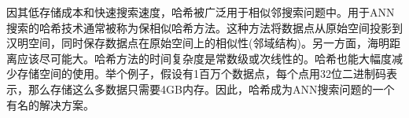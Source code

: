 \documentclass{article}
\begin{document}
因其低存储成本和快速搜索速度，哈希\cite{4031381,Ny2010Semi,PMID:24136430,Zhen:2012:PMM:2339530.2339678,Zhu:2013:LCH:2502081.2502107,Song:2013:IHL:2463676.2465274,Zhang2014SHL,NIPS2014_5332}被广泛用于相似邻搜索问题中。用于ANN搜索的哈希技术通常被称为保相似哈希方法。这种方法将数据点从原始空间投影到汉明空间，同时保存数据点在原始空间上的相似性(邻域结构)。另一方面，海明距离应该尽可能大。哈希方法的时间复杂度是常数级或次线性的\cite{PMID:24136430,Zhang2014SHL}。哈希也能大幅度减少存储空间的使用。举个例子，假设有1百万个数据点，每个点用32位二进制码表示，那么存储这么多数据只需要4GB内存。因此，哈希成为ANN搜索问题的一个有名的解决方案\cite{Gionis:1999:SSH:645925.671516,Datar:2004:LHS:997817.997857,
NIPS2008_3383,Kulis2010Learning,icml2010_WangKC10,
Liu2011Hashing,PMID:24136430,W2012Isotropic,Xu2013Harmonious,Zhang2014SHL,6909650,NIPS2014_5332}。
\end{document}
